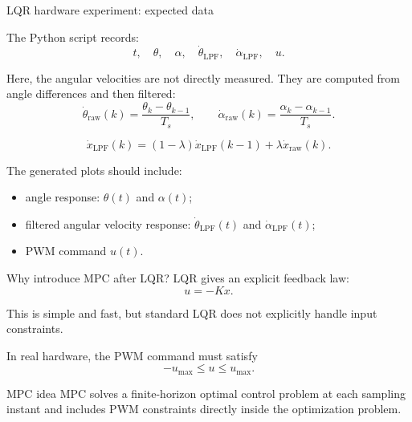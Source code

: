 \documentclass[aspectratio=169]{beamer}
\begin{document}
\begin{frame}{LQR hardware experiment: expected data}

The Python script records:
\[
t,\quad \theta,\quad \alpha,
\quad \dot\theta_{\mathrm{LPF}},
\quad \dot\alpha_{\mathrm{LPF}},
\quad u.
\]

\vspace{0.2cm}

Here, the angular velocities are not directly measured.
They are computed from angle differences and then filtered:
\[
\dot\theta_{\mathrm{raw}}(k)
=
\frac{\theta_k-\theta_{k-1}}{T_s},
\qquad
\dot\alpha_{\mathrm{raw}}(k)
=
\frac{\alpha_k-\alpha_{k-1}}{T_s}.
\]

\[
\dot{x}_{\mathrm{LPF}}(k)
=
(1-\lambda)\dot{x}_{\mathrm{LPF}}(k-1)
+
\lambda \dot{x}_{\mathrm{raw}}(k).
\]

\vspace{0.15cm}

The generated plots should include:
\begin{itemize}
    \item angle response: $\theta(t)$ and $\alpha(t)$;
    \item filtered angular velocity response: $\dot\theta_{\mathrm{LPF}}(t)$ and $\dot\alpha_{\mathrm{LPF}}(t)$;
    \item PWM command $u(t)$.
\end{itemize}

\vspace{0.15cm}


\end{frame}

\begin{frame}{Why introduce MPC after LQR?}
LQR gives an explicit feedback law:
\[
u=-Kx.
\]

\vspace{0.15cm}

This is simple and fast, but standard LQR does not explicitly handle input constraints.

\vspace{0.15cm}

In real hardware, the PWM command must satisfy
\[
-u_{\max}\le u\le u_{\max}.
\]

\vspace{0.2cm}
\begin{block}{MPC idea}
\small
MPC solves a finite-horizon optimal control problem at each sampling instant and includes PWM constraints directly inside the optimization problem.
\end{block}
\end{frame}
\end{document}
